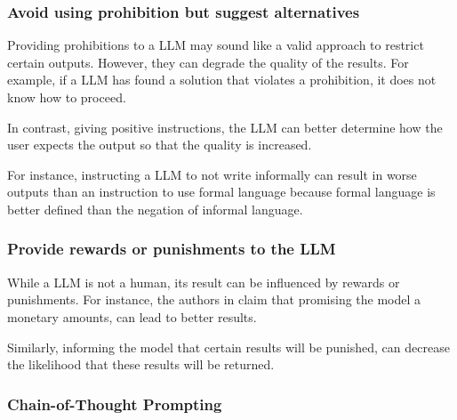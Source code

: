 \subsubsection{Avoid using prohibition but suggest alternatives}

Providing prohibitions to a \ac{LLM} may sound like a valid approach to restrict certain outputs. However, they can degrade the quality of the results. For example, if a \ac{LLM} has found a solution that violates a prohibition, it does not know how to proceed. 

In contrast, giving positive instructions, the \ac{LLM} can better determine how the user expects the output so that the quality is increased.

For instance, instructing a \ac{LLM} to not write informally can result in worse outputs than an instruction to use formal language because formal language is better defined than the negation of informal language. \cite{prompt_engineering_jonathan}

\subsubsection{Provide rewards or punishments to the LLM}

While a \ac{LLM} is not a human, its result can be influenced by rewards or punishments. For instance, the authors in \cite{bsharat2023principled} claim that promising the model a monetary amounts, can lead to better results. 

Similarly, informing the model that certain results will be punished, can decrease the likelihood that these results will be returned. \cite{bsharat2023principled}

\subsubsection{Chain-of-Thought Prompting}\label{sec:chain of thought}

